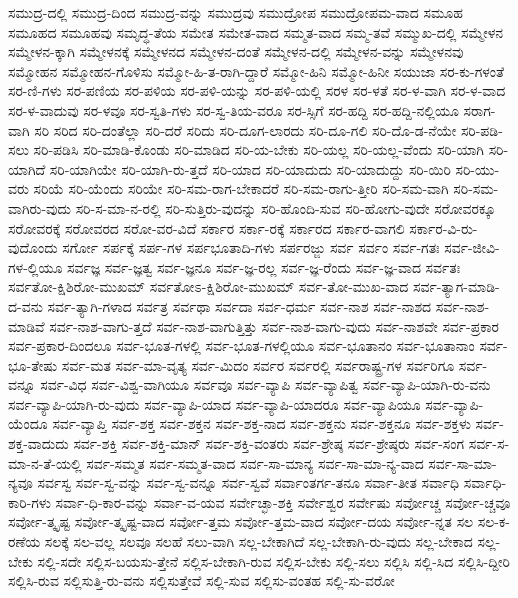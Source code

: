 {ಸಮುದ್ರ-ದಲ್ಲಿ
ಸಮುದ್ರ-ದಿಂದ
ಸಮುದ್ರ-ವನ್ನು
ಸಮುದ್ರವು
ಸಮುದ್ರೋಪ
ಸಮುದ್ರೋಪಮ-ವಾದ
ಸಮೂಹ
ಸಮೂಹದ
ಸಮೂಹವು
ಸಮೃದ್ಧ-ತೆಯ
ಸಮೇತ
ಸಮೇತ-ವಾದ
ಸಮ್ಮತ-ವಾದ
ಸಮ್ಮ-ತವೆ
ಸಮ್ಮುಖ-ದಲ್ಲಿ
ಸಮ್ಮೇಳನ
ಸಮ್ಮೇಳನ-ಕ್ಕಾಗಿ
ಸಮ್ಮೇಳನಕ್ಕೆ
ಸಮ್ಮೇಳನದ
ಸಮ್ಮೇಳನ-ದಂತೆ
ಸಮ್ಮೇಳನ-ದಲ್ಲಿ
ಸಮ್ಮೇಳನ-ವನ್ನು
ಸಮ್ಮೇಳನವು
ಸಮ್ಮೋಹನ
ಸಮ್ಮೋಹನ-ಗೊಳಿಸು
ಸಮ್ಮೋ-ಹಿ-ತ-ರಾಗಿ-ದ್ದಾರೆ
ಸಮ್ಮೋ-ಹಿನಿ
ಸಮ್ಮೋ-ಹಿನೀ
ಸಯುಜಾ
ಸರ-ಕು-ಗಳಂತೆ
ಸರ-ಣಿ-ಗಳು
ಸರ-ಪಣಿಯ
ಸರ-ಪಳಿಯ
ಸರ-ಪಳಿ-ಯನ್ನು
ಸರ-ಪಳಿ-ಯಲ್ಲಿ
ಸರಳ
ಸರ-ಳತೆ
ಸರ-ಳ-ವಾಗಿ
ಸರ-ಳ-ವಾದ
ಸರ-ಳ-ವಾದುವು
ಸರ-ಳವೂ
ಸರ-ಸ್ವತಿ-ಗಳು
ಸರ-ಸ್ವ-ತಿಯ-ವರೂ
ಸರ-ಸ್ಸಿಗೆ
ಸರ-ಹದ್ದಿ
ಸರ-ಹದ್ದಿ-ನಲ್ಲಿಯೂ
ಸರಾಗ-ವಾಗಿ
ಸರಿ
ಸರಿದ
ಸರಿ-ದಂತೆಲ್ಲಾ
ಸರಿ-ದರೆ
ಸರಿದು
ಸರಿ-ದೂಗ-ಲಾರದು
ಸರಿ-ದೂ-ಗಲಿ
ಸರಿ-ದೊ-ಡ-ನೆಯೇ
ಸರಿ-ಪಡಿ-ಸಲು
ಸರಿ-ಪಡಿಸಿ
ಸರಿ-ಮಾಡಿ-ಕೊಂಡು
ಸರಿ-ಮಾಡಿದ
ಸರಿ-ಯ-ಬೇಕು
ಸರಿ-ಯಲ್ಲ
ಸರಿ-ಯಲ್ಲ-ವೆಂದು
ಸರಿ-ಯಾಗಿ
ಸರಿ-ಯಾಗಿದೆ
ಸರಿ-ಯಾಗಿಯೇ
ಸರಿ-ಯಾಗಿ-ರು-ತ್ತದೆ
ಸರಿ-ಯಾದ
ಸರಿ-ಯಾದುದು
ಸರಿ-ಯಾದುದ್ದು
ಸರಿ-ಯಿರಿ
ಸರಿ-ಯು-ವರು
ಸರಿಯೆ
ಸರಿ-ಯೆಂದು
ಸರಿಯೇ
ಸರಿ-ಸಮ-ರಾಗ-ಬೇಕಾದರೆ
ಸರಿ-ಸಮ-ರಾಗು-ತ್ತೀರಿ
ಸರಿ-ಸಮ-ವಾಗಿ
ಸರಿ-ಸಮ-ವಾಗಿರು-ವುದು
ಸರಿ-ಸ-ಮಾ-ನ-ರಲ್ಲಿ
ಸರಿ-ಸುತ್ತಿರು-ವುದನ್ನು
ಸರಿ-ಹೊಂದಿ-ಸುವ
ಸರಿ-ಹೋಗು-ವುದೇ
ಸರೋವರಕ್ಕೂ
ಸರೋವರಕ್ಕೆ
ಸರೋವರದ
ಸರೋ-ವರ-ವಿದೆ
ಸರ್ಕಾರ
ಸರ್ಕಾ-ರಕ್ಕೆ
ಸರ್ಕಾರದ
ಸರ್ಕಾರ-ವಾಗಲಿ
ಸರ್ಕಾರ-ವಿ-ರು-ವುದೊಂದು
ಸರ್ಗೋ
ಸರ್ಪಕ್ಕೆ
ಸರ್ಪ-ಗಳ
ಸರ್ಪಭೂತಾದಿ-ಗಳು
ಸರ್ಪರಜ್ಜು
ಸರ್ವ
ಸರ್ವಂ
ಸರ್ವ-ಗತಃ
ಸರ್ವ-ಜೀವಿ-ಗಳ-ಲ್ಲಿಯೂ
ಸರ್ವಜ್ಞ
ಸರ್ವ-ಜ್ಞತ್ವ
ಸರ್ವ-ಜ್ಞನೂ
ಸರ್ವ-ಜ್ಞ-ರಲ್ಲ
ಸರ್ವ-ಜ್ಞ-ರೆಂದು
ಸರ್ವ-ಜ್ಞ-ವಾದ
ಸರ್ವತಃ
ಸರ್ವತೋ-ಕ್ಷಿಶಿರೋ-ಮುಖಮ್
ಸರ್ವತೋಽ-ಕ್ಷಿಶಿರೋ-ಮುಖಮ್
ಸರ್ವ-ತೋ-ಮುಖ-ವಾದ
ಸರ್ವ-ತ್ಯಾಗ-ಮಾಡಿ-ದ-ವನು
ಸರ್ವ-ತ್ಯಾಗಿ-ಗಳಾದ
ಸರ್ವತ್ರ
ಸರ್ವಥಾ
ಸರ್ವದಾ
ಸರ್ವ-ಧರ್ಮ
ಸರ್ವ-ನಾಶ
ಸರ್ವ-ನಾಶದ
ಸರ್ವ-ನಾಶ-ಮಾಡಿವೆ
ಸರ್ವ-ನಾಶ-ವಾಗು-ತ್ತದೆ
ಸರ್ವ-ನಾಶ-ವಾಗುತ್ತಿತ್ತು
ಸರ್ವ-ನಾಶ-ವಾಗು-ವುದು
ಸರ್ವ-ನಾಶವೇ
ಸರ್ವ-ಪ್ರಕಾರ
ಸರ್ವ-ಪ್ರಕಾರ-ದಿಂದಲೂ
ಸರ್ವ-ಭೂತ-ಗಳಲ್ಲಿ
ಸರ್ವ-ಭೂತ-ಗಳಲ್ಲಿಯೂ
ಸರ್ವ-ಭೂತಾನಂ
ಸರ್ವ-ಭೂತಾನಾಂ
ಸರ್ವ-ಭೂ-ತೇಷು
ಸರ್ವ-ಮತ
ಸರ್ವ-ಮಾ-ವೃತ್ಯ
ಸರ್ವ-ಮಿದಂ
ಸರ್ವರ
ಸರ್ವರಲ್ಲಿ
ಸರ್ವರಾಷ್ಟ್ರ-ಗಳ
ಸರ್ವರಿಗೂ
ಸರ್ವ-ವನ್ನೂ
ಸರ್ವ-ವಿಧ
ಸರ್ವ-ವಿಶ್ವ-ವಾಗಿಯೂ
ಸರ್ವವೂ
ಸರ್ವ-ವ್ಯಾಪಿ
ಸರ್ವ-ವ್ಯಾಪಿತ್ವ
ಸರ್ವ-ವ್ಯಾಪಿ-ಯಾಗಿ-ರು-ವನು
ಸರ್ವ-ವ್ಯಾಪಿ-ಯಾಗಿ-ರು-ವುದು
ಸರ್ವ-ವ್ಯಾಪಿ-ಯಾದ
ಸರ್ವ-ವ್ಯಾಪಿ-ಯಾದರೂ
ಸರ್ವ-ವ್ಯಾಪಿಯೂ
ಸರ್ವ-ವ್ಯಾಪಿ-ಯೆಂದೂ
ಸರ್ವ-ವ್ಯಾಪ್ತಿ
ಸರ್ವ-ಶಕ್ತ
ಸರ್ವ-ಶಕ್ತನ
ಸರ್ವ-ಶಕ್ತ-ನಾದ
ಸರ್ವ-ಶಕ್ತನು
ಸರ್ವ-ಶಕ್ತನೂ
ಸರ್ವ-ಶಕ್ತಳು
ಸರ್ವ-ಶಕ್ತ-ವಾದುದು
ಸರ್ವ-ಶಕ್ತಿ
ಸರ್ವ-ಶಕ್ತಿ-ಮಾನ್
ಸರ್ವ-ಶಕ್ತಿ-ವಂತರು
ಸರ್ವ-ಶ್ರೇಷ್ಠ
ಸರ್ವ-ಶ್ರೇಷ್ಠರು
ಸರ್ವ-ಸಂಗ
ಸರ್ವ-ಸ-ಮಾ-ನ-ತೆ-ಯಲ್ಲಿ
ಸರ್ವ-ಸಮ್ಮತ
ಸರ್ವ-ಸಮ್ಮತ-ವಾದ
ಸರ್ವ-ಸಾ-ಮಾನ್ಯ
ಸರ್ವ-ಸಾ-ಮಾ-ನ್ಯ-ವಾದ
ಸರ್ವ-ಸಾ-ಮಾ-ನ್ಯವೂ
ಸರ್ವಸ್ವ
ಸರ್ವ-ಸ್ವ-ವನ್ನು
ಸರ್ವ-ಸ್ವ-ವನ್ನೂ
ಸರ್ವ-ಸ್ವವೆ
ಸರ್ವಾಂತರ್ಗ-ತನೂ
ಸರ್ವಾ-ತೀತ
ಸರ್ವಾಧಿ
ಸರ್ವಾಧಿ-ಕಾರಿ-ಗಳು
ಸರ್ವಾ-ಧಿ-ಕಾರ-ವನ್ನು
ಸರ್ವಾ-ವ-ಯವ
ಸರ್ವೇಚ್ಛಾ-ಶಕ್ತಿ
ಸರ್ವೇಶ್ವರ
ಸರ್ವೇಷು
ಸರ್ವೋಚ್ಚ
ಸರ್ವೋ-ಚ್ಚವೂ
ಸರ್ವೋ-ತ್ಕೃಷ್ಟ
ಸರ್ವೋ-ತ್ಕೃಷ್ಟ-ವಾದ
ಸರ್ವೋ-ತ್ತಮ
ಸರ್ವೋ-ತ್ತಮ-ವಾದ
ಸರ್ವೋ-ದಯ
ಸರ್ವೋ-ನ್ನತ
ಸಲ
ಸಲ-ಕ-ರಣೆಯ
ಸಲಕ್ಕೆ
ಸಲ-ವಲ್ಲ
ಸಲವೂ
ಸಲಹೆ
ಸಲು-ವಾಗಿ
ಸಲ್ಲ-ಬೇಕಾಗಿದೆ
ಸಲ್ಲ-ಬೇಕಾಗಿ-ರು-ವುದು
ಸಲ್ಲ-ಬೇಕಾದ
ಸಲ್ಲ-ಬೇಕು
ಸಲ್ಲಿ-ಸದೇ
ಸಲ್ಲಿಸ-ಬಯಸು-ತ್ತೇನೆ
ಸಲ್ಲಿಸ-ಬೇಕಾಗಿ-ರುವ
ಸಲ್ಲಿಸ-ಬೇಕು
ಸಲ್ಲಿ-ಸಲು
ಸಲ್ಲಿಸಿ
ಸಲ್ಲಿ-ಸಿದ
ಸಲ್ಲಿಸಿ-ದ್ದೀರಿ
ಸಲ್ಲಿಸಿ-ರುವ
ಸಲ್ಲಿಸುತ್ತಿ-ರು-ವನು
ಸಲ್ಲಿಸುತ್ತೇವೆ
ಸಲ್ಲಿ-ಸುವ
ಸಲ್ಲಿಸು-ವಂತಹ
ಸಲ್ಲಿ-ಸು-ವರೋ
}
